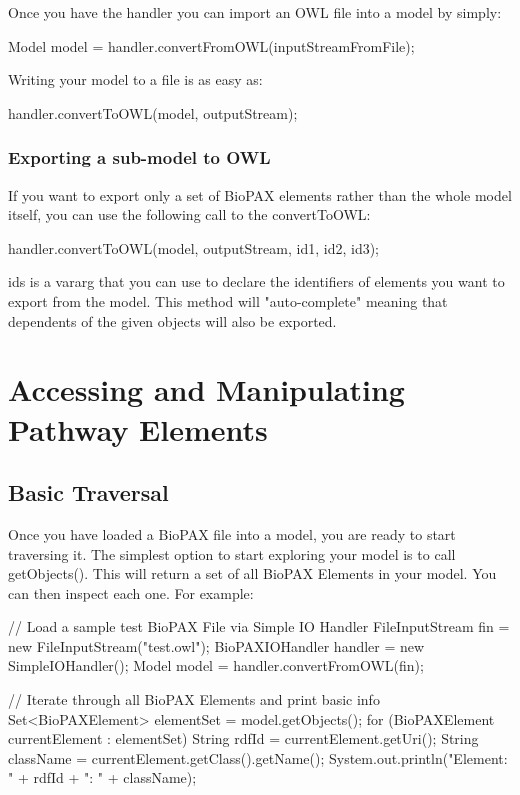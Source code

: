 \documentclass{tufte-book}
\begin{document}
Once you have the handler you can import an OWL file into a model by simply:

\begin{javacode}
Model model = handler.convertFromOWL(inputStreamFromFile);
\end{javacode}


Writing your model to a file is as easy as: 

\begin{javacode}
handler.convertToOWL(model, outputStream);
\end{javacode}


\subsection{Exporting a sub-model to OWL}

If you want to export only a set of BioPAX elements rather than the whole model itself, you can use the following call to the convertToOWL:

\begin{javacode}
handler.convertToOWL(model, outputStream, id1, id2, id3);
\end{javacode}


ids is a vararg that you can use to declare the identifiers of elements you want to export from the model. This method will "auto-complete" meaning that dependents of the given objects will also be exported.

\chapter{Accessing and Manipulating Pathway Elements}

\section{Basic Traversal} 

Once you have loaded a BioPAX file into a model, you are ready to start traversing it.
The simplest option to start exploring your model is to call getObjects(). This will return a set of all BioPAX Elements in your model. You can then inspect each one. For example:

\begin{javacode}
// Load a sample test BioPAX File via Simple IO Handler
FileInputStream fin = new FileInputStream("test.owl");
BioPAXIOHandler handler = new SimpleIOHandler();
Model model = handler.convertFromOWL(fin);

// Iterate through all BioPAX Elements and print basic info
Set<BioPAXElement> elementSet = model.getObjects();
for (BioPAXElement currentElement : elementSet)
{
 String rdfId = currentElement.getUri();
 String className = 
 currentElement.getClass().getName();
 System.out.println("Element: " + rdfId + ": " + className);
}
\end{javacode}
\end{document}
